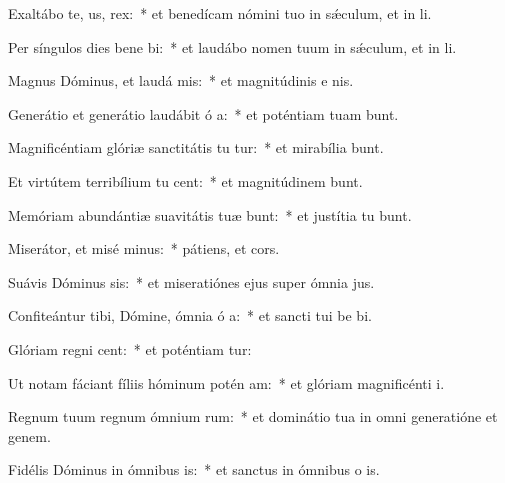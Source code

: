 \item Exaltábo te,  us, rex:~* et benedícam nómini tuo in sǽculum, et in  li.
\item Per síngulos dies bene bi:~* et laudábo nomen tuum in sǽculum, et in  li.
\item Magnus Dóminus, et laudá mis:~* et magnitúdinis e   nis.
\item Generátio et generátio laudábit ó a:~* et poténtiam tuam bunt.
\item Magnificéntiam glóriæ sanctitátis tu tur:~* et mirabília  bunt.
\item Et virtútem terribílium tu cent:~* et magnitúdinem  bunt.
\item Memóriam abundántiæ suavitátis tuæ bunt:~* et justítia tu bunt.
\item Miserátor, et misé minus:~* pátiens, et  cors.
\item Suávis Dóminus sis:~* et miseratiónes ejus super ómnia  jus.
\item Confiteántur tibi, Dómine, ómnia ó a:~* et sancti tui be bi.
\item Glóriam regni  cent:~* et poténtiam  tur:
\item Ut notam fáciant fíliis hóminum potén am:~* et glóriam magnificénti  i.
\item Regnum tuum regnum ómnium rum:~* et dominátio tua in omni generatióne et genem.
\item Fidélis Dóminus in ómnibus  is:~* et sanctus in ómnibus o is.
